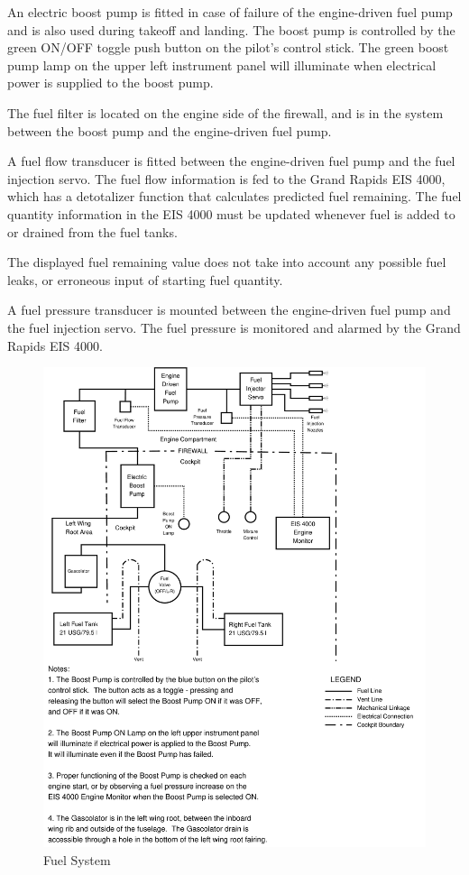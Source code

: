 An electric boost pump is fitted in case of failure of the engine-driven fuel pump and is also used during takeoff and landing. The boost pump is controlled by the green ON/OFF toggle push button on the pilot's control stick. The green boost pump lamp on the upper left instrument panel will illuminate when electrical power is supplied to the boost pump.

The fuel filter is located on the engine side of the firewall, and is in the system between the boost pump and the engine-driven fuel pump.

A fuel flow transducer is fitted between the engine-driven fuel pump and the fuel injection servo. The fuel flow information is fed to the Grand Rapids EIS 4000, which has a detotalizer function that calculates predicted fuel remaining. The fuel quantity information in the EIS 4000 must be updated whenever fuel is added to or drained from the fuel tanks.
\begin{Note}[WARNING]The displayed fuel remaining value does not take into account any possible fuel leaks, or erroneous input of starting fuel quantity. 
\end{Note}

A fuel pressure transducer is mounted between the engine-driven fuel pump and the fuel injection servo. The fuel pressure is monitored and alarmed by the Grand Rapids EIS 4000.
\begin{figure}
[hb!] 
\begin{center}
\includegraphics*[scale = 0.4]{../Diagrams/Fuel_system4}
\end{center}

%
\caption{Fuel System} 
\end{figure}
\clearpage 

